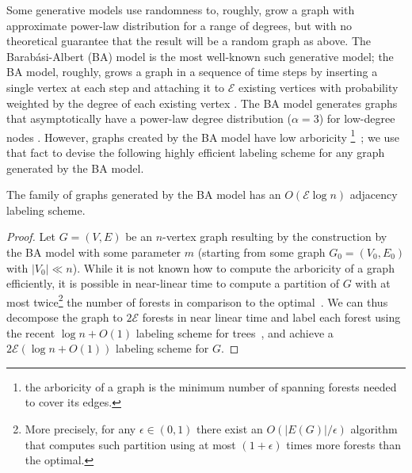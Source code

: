 
Some generative models use randomness to, roughly, grow a graph with approximate power-law distribution for 
a range of degrees, but with no theoretical guarantee that the result will be a random graph as above.
The Barab{\'a}si-Albert (BA) model is the most well-known such generative model; the BA model, roughly, grows a graph in a sequence of time steps by
inserting a single vertex at each step and attaching it to $\mathcal{E}$ existing vertices with probability weighted by the degree of each existing vertex \cite{barabasi1999emergence}. The BA model
generates graphs that asymptotically have a power-law degree distribution ($\alpha = 3$) for low-degree nodes \cite{DBLP:journals/rsa/BollobasRST01}.
However, graphs created by the BA model have low arboricity \footnote{the arboricity of a graph is the minimum number of spanning forests needed to cover its edges.}~\cite{goel2006bounded}; we use
that fact to devise the following highly efficient labeling scheme for any graph generated by the BA model. 

\begin{proposition}\label{Th:baLabeling}
The family of graphs generated by the BA model has an $O(\mathcal{E} \log n)$ adjacency labeling scheme.
\end{proposition}

\begin{proof}
Let  $G=(V,E)$  be an $n$-vertex graph resulting by the construction  by the BA model with some parameter $m$ (starting from some graph $G_0 = (V_0,E_0)$ with $\vert V_0 \vert \ll n$).
While it is not known how to compute the   arboricity of a graph efficiently, it is possible in near-linear time to compute a partition of $G$ with  at most twice\footnote{More precisely, for any $\epsilon \in (0,1)$  there exist an $O(|E(G)| / \epsilon)$ algorithm~\cite{kowalik2006approximation} that computes such partition using at most $(1+ \epsilon)$ times more forests than the optimal.} the number of forests in comparison to the optimal~\cite{arikati1997efficient}.
We can thus decompose the graph to $2\mathcal{E}$ forests in near linear time and label each forest using the recent $\log n + O(1)$ labeling scheme for trees~\cite{alstrup2015optimal},  and achieve a $2\mathcal{E} (\log n+O(1))$ labeling scheme for $G$.
\end{proof}

